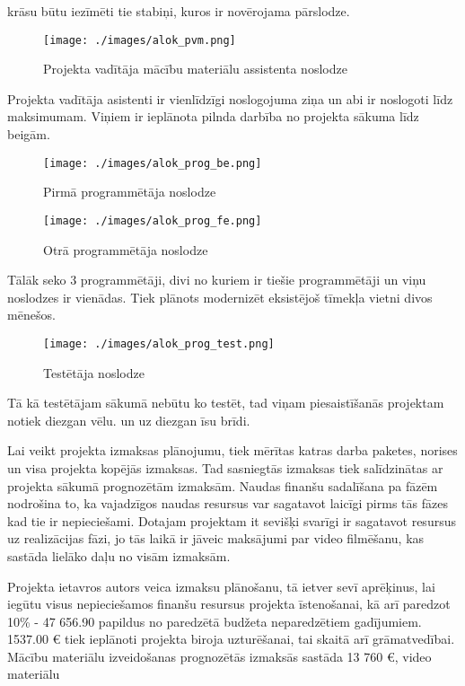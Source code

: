 krāsu būtu iezīmēti tie stabiņi, kuros ir novērojama pārslodze. 
\begin{figure}[h!]
  \centering
  \texttt{[image: ./images/alok\_pvm.png]}
  \label{image:alok_pvm}
  \caption{Projekta vadītāja mācību materiālu assistenta noslodze}
\end{figure}
Projekta vadītāja asistenti ir vienlīdzīgi noslogojuma ziņa un abi ir noslogoti līdz maksimumam.
Viņiem ir ieplānota pilnda darbība no projekta sākuma līdz beigām.
\par
\begin{figure}[h!]
  \centering
  \texttt{[image: ./images/alok\_prog\_be.png]}
  \label{image:alok_prog_be}
  \caption{Pirmā programmētāja noslodze}
\end{figure}
\begin{figure}[h!]
  \centering
  \texttt{[image: ./images/alok\_prog\_fe.png]}
  \label{image:alok_prog_fe}
  \caption{Otrā programmētāja noslodze}
\end{figure}
Tālāk seko 3 programmētāji, divi no kuriem ir tiešie programmētāji un viņu noslodzes ir vienādas.
Tiek plānots modernizēt eksistējoš tīmekļa vietni divos mēnešos.
\par
\begin{figure}[h!]
  \centering
  \texttt{[image: ./images/alok\_prog\_test.png]}
  \label{image:alok_prog_test}
  \caption{Testētāja noslodze}
\end{figure}
Tā kā testētājam sākumā nebūtu ko testēt, tad viņam piesaistīšanās projektam notiek diezgan vēlu.
un uz diezgan īsu brīdi. 
\par
Lai veikt projekta izmaksas plānojumu, tiek mērītas katras darba paketes, norises un visa projekta
kopējās izmaksas. Tad sasniegtās izmaksas tiek salīdzinātas ar projekta sākumā prognozētām
izmaksām. Naudas finanšu sadalīšana pa fāzēm nodrošina to, ka vajadzīgos naudas resursus var
sagatavot laicīgi pirms tās fāzes kad tie ir nepieciešami. Dotajam projektam it sevišķi svarīgi
ir sagatavot resursus uz realizācijas fāzi, jo tās laikā ir jāveic maksājumi par video filmēšanu,
kas sastāda lielāko daļu no visām izmaksām.
\par
Projekta ietavros autors veica izmaksu plānošanu, tā ietver sevī aprēķinus, lai iegūtu visus
nepieciešamos finanšu resursus projekta īstenošanai, kā arī paredzot 10\% -  47 656.90 papildus no paredzētā 
budžeta neparedzētiem gadījumiem. 1537.00 € tiek ieplānoti projekta biroja uzturēšanai, tai skaitā
arī grāmatvedībai. Mācību materiālu izveidošanas prognozētās izmaksās sastāda 13 760 €, video materiālu
